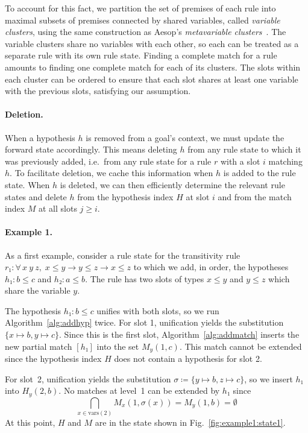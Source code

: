 \documentclass[runningheads]{llncs}
\newcommand{\All}[2]{\ensuremath{\forall\, #1,\; #2}}
\newcommand{\vars}{\ensuremath{\mathrm{vars}}}
\begin{document}
To account for this fact, we partition the set of premises of each rule into maximal subsets of premises connected by shared variables, called \emph{variable clusters}, using the same construction as Aesop's \emph{metavariable clusters}~\cite{Aesop}.
The variable clusters share no variables with each other, so each can be treated as a separate rule with its own rule state.
Finding a complete match for a rule amounts to finding one complete match for each of its clusters.
The slots within each cluster can be ordered to ensure that each slot shares at least one variable with the previous slots, satisfying our assumption.

\paragraph{Deletion.}
When a hypothesis $h$ is removed from a goal's context, we must update the forward state accordingly.
This means deleting $h$ from any rule state to which it was previously added, i.e.\ from any rule state for a rule $r$ with a slot $i$ matching $h$.
To facilitate deletion, we cache this information when $h$ is added to the rule state.
When $h$ is deleted, we can then efficiently determine the relevant rule states and delete $h$ from the hypothesis index $H$ at slot $i$ and from the match index $M$ at all slots $j ≥ i$.

\paragraph{Example 1.}
As a first example, consider a rule state for the transitivity rule $r₁ : \All{x~y~z}{x ≤ y → y ≤ z → x ≤ z}$ to which we add, in order, the hypotheses
$h₁ : b ≤ c$ and $h₂ : a ≤ b$.
The rule has two slots of types $x ≤ y$ and $y ≤ z$ which share the variable $y$.

The hypothesis $h₁ : b ≤ c$ unifies with both slots, so we run Algorithm~\ref{alg:addhyp} twice.
For slot 1, unification yields the substitution $\{x ↦ b, y ↦ c\}$.
Since this is the first slot, Algorithm~\ref{alg:addmatch} inserts the new partial match $[h₁]$ into the set $M_{y}(1, c)$.
This match cannot be extended since the hypothesis index $H$ does not contain a hypothesis for slot 2.

For slot~2, unification yields the substitution $σ ≔ \{y ↦ b, z ↦ c\}$, so we insert $h₁$ into $H_{y}(2, b)$.
No matches at level~1 can be extended by $h₁$ since
\[
  \bigcap_{x \in \vars(2)} M_{x}(1, σ(x)) = M_{y}(1, b) = \emptyset
\]
At this point, $H$ and $M$ are in the state shown in Fig.~\ref{fig:example1:state1}.
\end{document}

